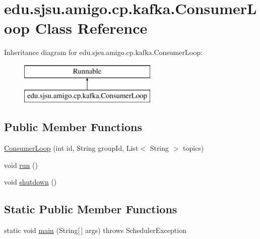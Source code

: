 \hypertarget{classedu_1_1sjsu_1_1amigo_1_1cp_1_1kafka_1_1_consumer_loop}{}\section{edu.\+sjsu.\+amigo.\+cp.\+kafka.\+Consumer\+Loop Class Reference}
\label{classedu_1_1sjsu_1_1amigo_1_1cp_1_1kafka_1_1_consumer_loop}
Inheritance diagram for edu.\+sjsu.\+amigo.\+cp.\+kafka.\+Consumer\+Loop\+:\begin{figure}[H]
\begin{center}
\leavevmode
\includegraphics[height=2.000000cm]{classedu_1_1sjsu_1_1amigo_1_1cp_1_1kafka_1_1_consumer_loop}
\end{center}
\end{figure}
\subsection*{Public Member Functions}
\begin{DoxyCompactItemize}
\item 
\hyperlink{classedu_1_1sjsu_1_1amigo_1_1cp_1_1kafka_1_1_consumer_loop_aaa2ca0a5aab4e8df4110d9bd3ccb771a}{Consumer\+Loop} (int id, String group\+Id, List$<$ String $>$ topics)
\item 
void \hyperlink{classedu_1_1sjsu_1_1amigo_1_1cp_1_1kafka_1_1_consumer_loop_adca27141d9a3f2ad526f060764321b15}{run} ()
\item 
void \hyperlink{classedu_1_1sjsu_1_1amigo_1_1cp_1_1kafka_1_1_consumer_loop_adfc4a8e0be1d0a4c6ea3ddeb9bee0b87}{shutdown} ()
\end{DoxyCompactItemize}
\subsection*{Static Public Member Functions}
\begin{DoxyCompactItemize}
\item 
static void \hyperlink{classedu_1_1sjsu_1_1amigo_1_1cp_1_1kafka_1_1_consumer_loop_a8f37a453074be900b2b72b24162ebec1}{main} (String\mbox{[}$\,$\mbox{]} args)  throws Scheduler\+Exception 
\end{DoxyCompactItemize}



